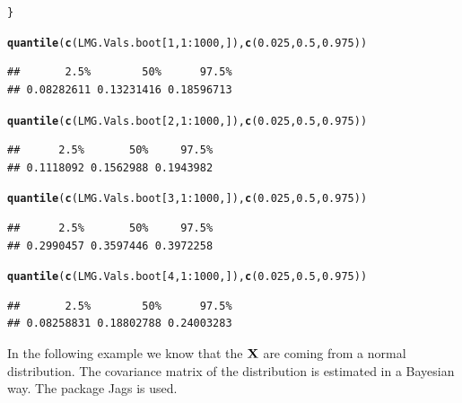 \documentclass[11pt,a4paper,twoside]{book}\usepackage[]{graphicx}\usepackage[]{color}
\makeatletter
\newcommand{\hlnum}[1]{\textcolor[rgb]{0.686,0.059,0.569}{#1}}%
\newcommand{\hlopt}[1]{\textcolor[rgb]{0,0,0}{#1}}%
\newcommand{\hlstd}[1]{\textcolor[rgb]{0.345,0.345,0.345}{#1}}%
\newcommand{\hlkwd}[1]{\textcolor[rgb]{0.737,0.353,0.396}{\textbf{#1}}}%
\newenvironment{kframe}{%
 \def\at@end@of@kframe{}%
 \ifinner\ifhmode%
  \def\at@end@of@kframe{\end{minipage}}%
  \begin{minipage}{\columnwidth}%
 \fi\fi%
 \def\FrameCommand##1{\hskip\@totalleftmargin \hskip-\fboxsep
 \colorbox{shadecolor}{##1}\hskip-\fboxsep
     \hskip-\linewidth \hskip-\@totalleftmargin \hskip\columnwidth}%
 \MakeFramed {\advance\hsize-\width
   \@totalleftmargin\z@ \linewidth\hsize
   \@setminipage}}%
 {\par\unskip\endMakeFramed%
 \at@end@of@kframe}
\newenvironment{knitrout}{}{} %
\makeatother
\begin{document}
\begin{knitrout}
\begin{kframe}
\begin{alltt}
\hlstd{\}}

\hlkwd{quantile}\hlstd{(}\hlkwd{c}\hlstd{(LMG.Vals.boot[}\hlnum{1}\hlstd{,}\hlnum{1}\hlopt{:}\hlnum{1000}\hlstd{,]),} \hlkwd{c}\hlstd{(}\hlnum{0.025}\hlstd{,} \hlnum{0.5}\hlstd{,} \hlnum{0.975}\hlstd{))}
\end{alltt}
\begin{verbatim}
##       2.5%        50%      97.5% 
## 0.08282611 0.13231416 0.18596713
\end{verbatim}
\begin{alltt}
\hlkwd{quantile}\hlstd{(}\hlkwd{c}\hlstd{(LMG.Vals.boot[}\hlnum{2}\hlstd{,}\hlnum{1}\hlopt{:}\hlnum{1000}\hlstd{,]),} \hlkwd{c}\hlstd{(}\hlnum{0.025}\hlstd{,} \hlnum{0.5}\hlstd{,} \hlnum{0.975}\hlstd{))}
\end{alltt}
\begin{verbatim}
##      2.5%       50%     97.5% 
## 0.1118092 0.1562988 0.1943982
\end{verbatim}
\begin{alltt}
\hlkwd{quantile}\hlstd{(}\hlkwd{c}\hlstd{(LMG.Vals.boot[}\hlnum{3}\hlstd{,}\hlnum{1}\hlopt{:}\hlnum{1000}\hlstd{,]),} \hlkwd{c}\hlstd{(}\hlnum{0.025}\hlstd{,} \hlnum{0.5}\hlstd{,} \hlnum{0.975}\hlstd{))}
\end{alltt}
\begin{verbatim}
##      2.5%       50%     97.5% 
## 0.2990457 0.3597446 0.3972258
\end{verbatim}
\begin{alltt}
\hlkwd{quantile}\hlstd{(}\hlkwd{c}\hlstd{(LMG.Vals.boot[}\hlnum{4}\hlstd{,}\hlnum{1}\hlopt{:}\hlnum{1000}\hlstd{,]),} \hlkwd{c}\hlstd{(}\hlnum{0.025}\hlstd{,} \hlnum{0.5}\hlstd{,} \hlnum{0.975}\hlstd{))}
\end{alltt}
\begin{verbatim}
##       2.5%        50%      97.5% 
## 0.08258831 0.18802788 0.24003283
\end{verbatim}
\end{kframe}
\end{knitrout}

In the following example we know that the ${\mathbf{X}}$ are coming from a normal distribution. The covariance matrix of the distribution is estimated in a Bayesian way. The package Jags is used.
\end{document}

